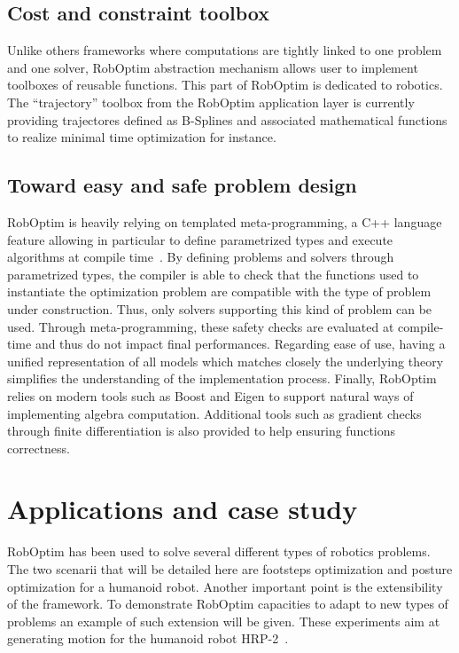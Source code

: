\documentclass[conference,final,a4paper,twocolumn,9pt]{IEEEtran}
\begin{document}
\subsection{Cost and constraint toolbox}


Unlike others frameworks where computations are tightly linked to one
problem and one solver, RobOptim abstraction mechanism allows user to
implement toolboxes of reusable functions. This part of RobOptim is
dedicated to robotics. The ``trajectory'' toolbox from the RobOptim
application layer is currently providing trajectores defined as
B-Splines and associated mathematical functions to realize minimal
time optimization for instance.


\subsection{Toward easy and safe problem design}


RobOptim is heavily relying on templated meta-programming, a C++
language feature allowing in particular to define parametrized types
and execute algorithms at compile time~\cite{iso14882}. By defining
problems and solvers through parametrized types, the compiler is able
to check that the functions used to instantiate the optimization
problem are compatible with the type of problem under
construction. Thus, only solvers supporting this kind of problem can
be used. Through meta-programming, these safety checks are evaluated
at compile-time and thus do not impact final performances. Regarding
ease of use, having a unified representation of all models which
matches closely the underlying theory simplifies the understanding of
the implementation process.  Finally, RobOptim relies on modern tools
such as Boost and Eigen to support natural ways of implementing
algebra computation. Additional tools such as gradient checks through
finite differentiation is also provided to help ensuring functions
correctness.


\section{Applications and case study}\label{sec:application}


RobOptim has been used to solve several different types of robotics
problems. The two scenarii that will be detailed here are footsteps
optimization and posture optimization for a humanoid robot. Another
important point is the extensibility of the framework. To demonstrate
RobOptim capacities to adapt to new types of problems an example of
such extension will be given. These experiments aim at generating
motion for the humanoid robot HRP-2~\cite{hrp2}.
\end{document}
